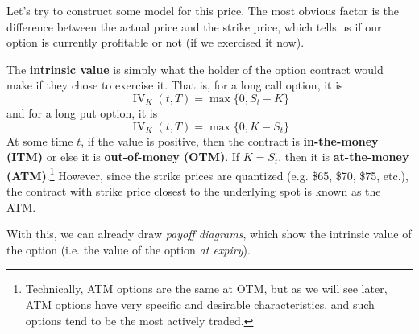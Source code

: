 \documentclass{article}
\DeclareMathOperator{\IV}{IV}
\begin{document}
    Let's try to construct some model for this price. The most obvious factor is the difference between the actual price and the strike price, which tells us if our option is currently profitable or not (if we exercised it now). 

    \begin{definition}
      \label{def:intrinsic-value}
      The \textbf{intrinsic value} is simply what the holder of the option contract would make if they chose to exercise it. That is, for a long call option, it is 
      \begin{equation}
        \IV_K (t, T) = \max\{0, S_t - K\}
      \end{equation}
      and for a long put option, it is 
      \begin{equation}
        \IV_K (t, T) = \max\{0, K - S_t\}
      \end{equation}
      At some time $t$, if the value is positive, then the contract is \textbf{in-the-money (ITM)} or else it is \textbf{out-of-money (OTM)}. If $K = S_t$, then it is \textbf{at-the-money (ATM)}.\footnote{Technically, ATM options are the same at OTM, but as we will see later, ATM options have very specific and desirable characteristics, and such options tend to be the most actively traded. } However, since the strike prices are quantized (e.g. \$65, \$70, \$75, etc.), the contract with strike price closest to the underlying spot is known as the ATM. 
    \end{definition}

    With this, we can already draw \textit{payoff diagrams}, which show the intrinsic value of the option (i.e. the value of the option \textit{at expiry}). 
\end{document}
